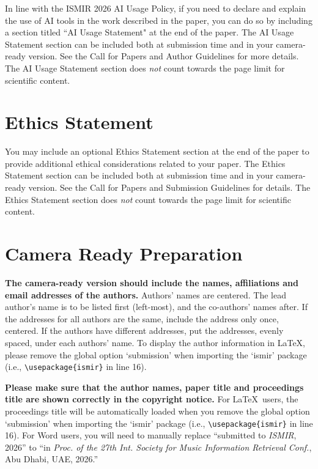 \documentclass{article}
\begin{document}
In line with the ISMIR 2026 AI Usage Policy, if you need to declare and explain the use of AI tools in the work described in the paper, you can do so by including a section titled ``AI Usage Statement" at the end of the paper. The AI Usage Statement section can be included both at submission time and in your camera-ready version. See the Call for Papers and Author Guidelines for more details. The AI Usage Statement section does \textit{not} count towards the page limit for scientific content. 

\section{Ethics Statement}

You may include an optional Ethics Statement section at the end of the paper to provide additional ethical considerations related to your paper. The Ethics Statement section can be included both at submission time and in your camera-ready version. See the Call for Papers and Submission Guidelines for details. The Ethics Statement section does \textit{not} count towards the page limit for scientific content.

\section{Camera Ready Preparation}\label{sec:cameraready}

\textbf{The camera-ready version should include the names, affiliations and email addresses of the authors.} Authors' names are centered. The lead author's name is to be listed first (left-most), and the co-authors' names after. If the addresses for all authors are the same, include the address only once, centered. If the authors have different addresses, put the addresses, evenly spaced, under each authors' name. To display the author information in \LaTeX, please remove the global option `submission' when importing the `ismir' package (i.e., \texttt{\textbackslash usepackage\{ismir\}} in line 16).

\textbf{Please make sure that the author names, paper title and proceedings title are shown correctly in the copyright notice.} For \LaTeX\ users, the proceedings title will be automatically loaded when you remove the global option `submission' when importing the `ismir' package (i.e., \texttt{\textbackslash usepackage\{ismir\}} in line 16). For Word users, you will need to manually replace ``submitted to \textit{ISMIR}, 2026'' to ``in \textit{Proc. of the 27th Int. Society for Music Information Retrieval Conf.}, Abu Dhabi, UAE, 2026.''
\end{document}
